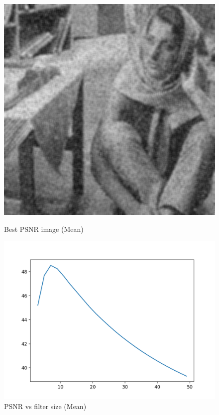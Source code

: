 \documentclass{article}
\begin{document}
    \begin{figure}[!htb]
      \includegraphics[scale=0.3]{./basic_denoising/barbara/average_best_sp.png}
      \caption{Best PSNR image (Mean)}
    \endminipage \hfill
      \includegraphics[scale=.45]{./basic_denoising/barbara/average_psnr_sp.png}
      \caption{PSNR vs filter size (Mean)}
    \endminipage
    \end{figure}
    
\end{document}
